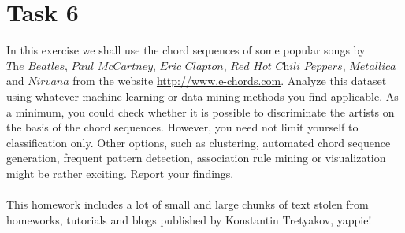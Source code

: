 \documentclass{article}
\begin{document}
\section*{Task 6}
In this exercise we shall use the chord sequences of some popular songs by $\textit{The Beatles}$, $\textit{Paul McCartney}$, $\textit{Eric Clapton}$, $\textit{Red Hot Chili Peppers}$, $\textit{Metallica}$ and $\textit{Nirvana}$ from the website \url{http://www.e-chords.com}. Analyze this dataset using whatever machine learning or data mining methods you find applicable. As a minimum, you could check whether it is possible to discriminate the artists on the basis of the chord sequences. However, you need not limit yourself to classification only. Other options, such as clustering, automated chord sequence generation, frequent pattern detection, association rule mining or visualization might be rather exciting. Report your findings.
\\\\
This homework includes a lot of small and large chunks of text stolen from homeworks, tutorials and blogs published by Konstantin Tretyakov, yappie! \smiley{} 
\end{document}
